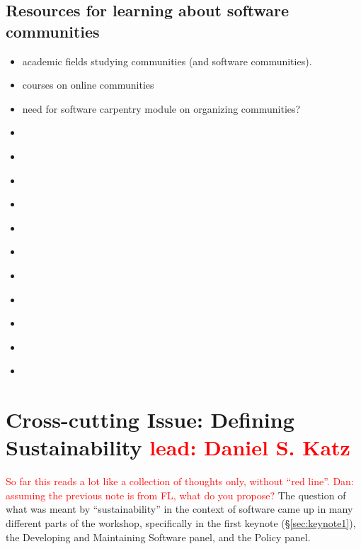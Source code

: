 \documentclass[11pt, oneside]{amsart}
\newcommand{\todo}[1]{{\color{blue}$\blacksquare$~\textsf{[TODO: #1]}}}
\newcommand{\note}[1]{ {\textcolor{red}    { #1 }}}
\begin{document}
\subsection{Resources for learning about software communities}
\begin{itemize}
\item academic fields studying communities (and software communities).
\item courses on online communities
\item need for software carpentry module on organizing communities?
\item \cite{howison_scientific_2011}
\item \cite{citeulike:11831265}
\item \cite{citeulike:7888211}
\item \cite{citeulike:478633}
\item \cite{opac-b1134063}
\item \cite{DBLP:conf/cscw/HowisonH11}
\item \cite{DBLP:conf/cscw/2011}
\item \cite{Trapani:2011}
\item \cite{Allsopp:2012}
\item \cite{1749-4699-6-1-015010}
\item \cite{Turk:2013:SCH:2484762.2484782}
\end{itemize}

%
%
%


\section{Cross-cutting Issue: Defining Sustainability \note{lead: Daniel S. Katz}}  \label{sec:cross-cutting}

\note{So far this reads a lot like a collection of thoughts only, without ``red line''.}
\note{Dan: assuming the previous note is from FL, what do you propose?}
The question of what was meant by ``sustainability'' in the context of software
came up in many different parts of the workshop, specifically in the first
keynote (\S\ref{sec:keynote1}), the Developing and Maintaining Software panel,
and the Policy panel.
\end{document}
